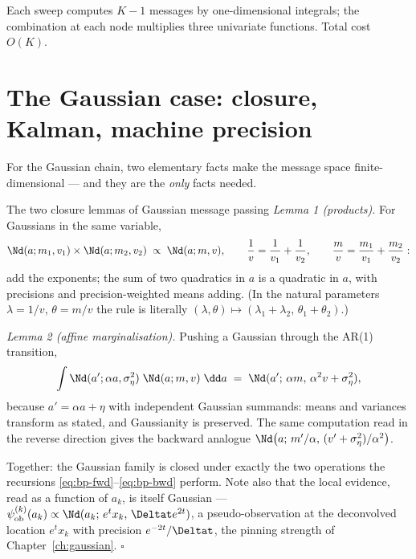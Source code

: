Each sweep computes $K - 1$ messages by one-dimensional integrals; the
combination at each node multiplies three univariate functions. Total cost
$O(K)$.

\section{The Gaussian case: closure, Kalman, machine precision}
\label{sec:bp-gaussian}

For the Gaussian chain, two elementary facts make the message space
finite-dimensional --- and they are the \emph{only} facts needed.

\begin{toolbox}{The two closure lemmas of Gaussian message passing}
\emph{Lemma 1 (products).} For Gaussians in the same variable,
\begin{equation*}
  \Nd(a; m_1, v_1) \times \Nd(a; m_2, v_2)
  \;\propto\; \Nd(a; m, v),
  \qquad
  \frac{1}{v} = \frac{1}{v_1} + \frac{1}{v_2},
  \qquad
  \frac{m}{v} = \frac{m_1}{v_1} + \frac{m_2}{v_2} :
\end{equation*}
add the exponents; the sum of two quadratics in $a$ is a quadratic in $a$,
with precisions and precision-weighted means adding. (In the natural
parameters $\lambda = 1/v$, $\theta = m/v$ the rule is literally
$(\lambda, \theta) \mapsto (\lambda_1 + \lambda_2,\,
\theta_1 + \theta_2)$.)

\emph{Lemma 2 (affine marginalisation).} Pushing a Gaussian through the
AR(1) transition,
\begin{equation*}
  \int \Nd(a'; \alpha a, \sigma_\eta^2)\; \Nd(a; m, v)\; \dd a
  \;=\; \Nd(a';\, \alpha m,\, \alpha^2 v + \sigma_\eta^2),
\end{equation*}
because $a' = \alpha a + \eta$ with independent Gaussian summands: means
and variances transform as stated, and Gaussianity is preserved. The same
computation read in the reverse direction gives the backward analogue
$\Nd\big(a;\, m'/\alpha,\, (v' + \sigma_\eta^2)/\alpha^2\big)$.

Together: the Gaussian family is closed under exactly the two operations
the recursions \eqref{eq:bp-fwd}--\eqref{eq:bp-bwd} perform. Note also that
the local evidence, read as a function of $a_k$, is itself Gaussian ---
$\psi^{(k)}_{\mathrm{ob}}(a_k) \propto
\Nd(a_k;\, e^{t} x_k,\, \Deltat e^{2t})$, a pseudo-observation at the
deconvolved location $e^t x_k$ with precision $e^{-2t}/\Deltat$, the
pinning strength of Chapter~\ref{ch:gaussian}. \hfill$\square$
\end{toolbox}

